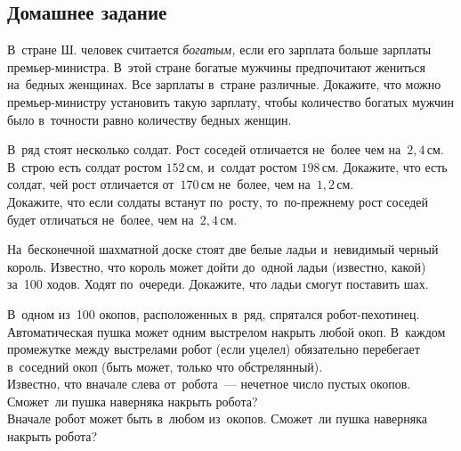 

\subsection*{Домашнее задание}



\begin{problems}


\item
В~стране Ш. человек считается \emph{богатым,} если его зарплата больше
зарплаты премьер-министра.
В~этой стране богатые мужчины предпочитают жениться на~бедных женщинах.
Все зарплаты в~стране различные.
Докажите, что можно премьер-министру установить такую зарплату, чтобы
количество богатых мужчин было в~точности равно количеству бедных женщин.

\item
В~ряд стоят несколько солдат.
Рост соседей отличается не~более чем на~$2{,}4\,\text{см}$.
\\
\subproblem
В~строю есть солдат ростом $152\,\text{см}$, и~солдат ростом $198\,\text{см}$.
Докажите, что есть солдат, чей рост отличается от~$170\,\text{см}$ не~более, чем
на~$1{,}2\,\text{см}$.
\\
\subproblem
Докажите, что если солдаты встанут по~росту, то~по-прежнему рост соседей будет
отличаться не~более, чем на~$2{,}4\,\text{см}$.

\item
На~бесконечной шахматной доске стоят две белые ладьи и~невидимый черный король.
Известно, что король может дойти до~одной ладьи (известно, какой) за~100 ходов.
Ходят по~очереди.
Докажите, что ладьи смогут поставить шах.

\item
В~одном из~100 окопов, расположенных в~ряд, спрятался робот-пехотинец.
Автоматическая пушка может одним выстрелом накрыть любой окоп.
В~каждом промежутке между выстрелами робот (если уцелел) обязательно перебегает
в~соседний окоп (быть может, только что обстрелянный).
\\
\subproblem
Известно, что вначале слева от~робота~--- нечетное число пустых окопов.
Сможет~ли пушка наверняка накрыть робота?
\\
\subproblem
Вначале робот может быть в~любом из~окопов.
Сможет~ли пушка наверняка накрыть робота?

\end{problems}

